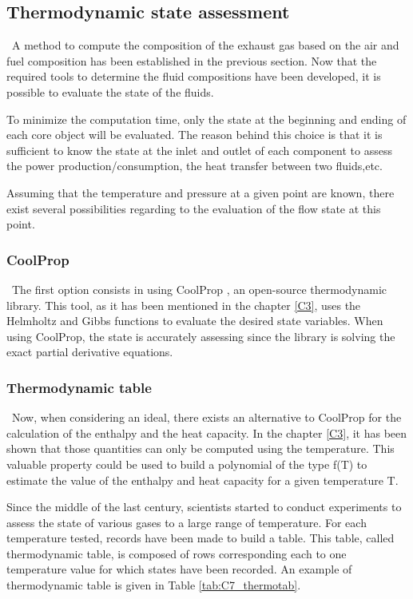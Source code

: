 \subsection{Thermodynamic state assessment}\label{C7: thermo_state}
\quad\ A method to compute the composition of the exhaust gas based on the air and fuel composition has been established in the previous section. Now that the required tools to determine the fluid compositions have been developed, it is possible to evaluate the state of the fluids. 

To minimize the computation time, only the state at the beginning and ending of each core object will be evaluated. The reason behind this choice is that it is sufficient to know the state at the inlet and outlet of each component to assess the power production/consumption, the heat transfer between two fluids,etc.

Assuming that the temperature and pressure at a given point are known, there exist several possibilities regarding to the evaluation of the flow state at this point. 

\subsubsection{CoolProp}
\quad\ The first option consists in using CoolProp \cite{Bell2014}, an open-source thermodynamic library. This tool, as it has been mentioned in the chapter \ref{C3}, uses the Helmholtz and Gibbs functions to evaluate the desired state variables. When using CoolProp, the state is accurately assessing since the library is solving the exact partial derivative equations. 

\subsubsection{Thermodynamic table}
\quad\ Now, when considering an ideal, there exists an alternative to CoolProp for the calculation of the enthalpy and the heat capacity. In the chapter \ref{C3}, it has been shown that those quantities can only be computed using the temperature. This valuable property could be used to build a polynomial of the type f(T) to estimate the value of the enthalpy and heat capacity for a given temperature T. 

Since the middle of the last century, scientists started to conduct experiments to assess the state of various gases to a large range of temperature. For each temperature tested, records have been made to build a table. This table, called thermodynamic table, is composed of rows corresponding each to one temperature value for which states have been recorded. 
An example of thermodynamic table is given in Table \ref{tab:C7_thermotab}.

